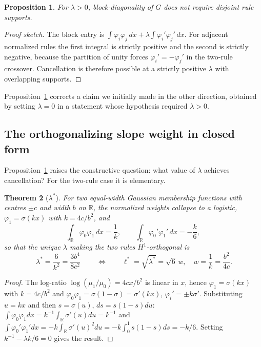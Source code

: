 \documentclass[11pt]{article}
\theoremstyle{plain}
\newtheorem{theorem}{Theorem}
\newtheorem{proposition}[theorem]{Proposition}
\theoremstyle{definition}
\newcommand{\R}{\mathbb{R}}
\begin{document}
\begin{proposition}
\label{prop:notdisjoint}
For $\lambda>0$, block-diagonality of $G$ does \emph{not} require disjoint rule
supports.
\end{proposition}

\begin{proof}[Proof sketch]
The block entry is
$\int\varphi_i\varphi_j\,dx+\lambda\int\varphi_i'\varphi_j'\,dx$. For adjacent
normalized rules the first integral is strictly positive and the second is
strictly negative, because the partition of unity forces
$\varphi_i'=-\varphi_j'$ in the two-rule crossover. Cancellation is therefore
possible at a strictly positive $\lambda$ with overlapping supports.
\end{proof}

Proposition~\ref{prop:notdisjoint} corrects a claim we initially made in the
other direction, obtained by setting $\lambda=0$ in a statement whose hypothesis
required $\lambda>0$.

\subsection{The orthogonalizing slope weight in closed form}

Proposition~\ref{prop:notdisjoint} raises the constructive question: what value
of $\lambda$ achieves cancellation? For the two-rule case it is elementary.

\begin{theorem}[$\lambda^{*}$]
\label{thm:lambda}
For two equal-width Gaussian membership functions with centres $\pm c$ and
width $b$ on $\R$, the normalized weights collapse to a logistic,
$\varphi_1=\sigma(kx)$ with $k=4c/b^{2}$, and
\begin{equation}
\int_{\R}\varphi_0\varphi_1\,dx=\frac1k,\qquad
\int_{\R}\varphi_0'\varphi_1'\,dx=-\frac{k}{6},
\end{equation}
so that the unique $\lambda$ making the two rules $H^1$-orthogonal is
\begin{equation}
\boxed{\ \lambda^{*}=\frac{6}{k^{2}}=\frac{3b^{4}}{8c^{2}}\ }
\qquad\Longleftrightarrow\qquad
\ell^{*}=\sqrt{\lambda^{*}}=\sqrt{6}\,w,\quad w=\frac{1}{k}=\frac{b^{2}}{4c}.
\end{equation}
\end{theorem}

\begin{proof}
The log-ratio $\log(\mu_1/\mu_0)=4cx/b^{2}$ is linear in $x$, hence
$\varphi_1=\sigma(kx)$ with $k=4c/b^{2}$ and
$\varphi_0\varphi_1=\sigma(1-\sigma)=\sigma'(kx)$, $\varphi_i'=\pm k\sigma'$.
Substituting $u=kx$ and then $s=\sigma(u)$, $ds=s(1-s)du$:
$\int\varphi_0\varphi_1dx=k^{-1}\int_\R\sigma'(u)du=k^{-1}$ and
$\int\varphi_0'\varphi_1'dx=-k\int_\R\sigma'(u)^2du=-k\int_0^1 s(1-s)ds=-k/6$.
Setting $k^{-1}-\lambda k/6=0$ gives the result.
\end{proof}
\end{document}
